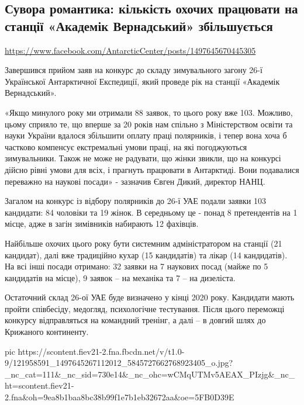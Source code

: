  
 

\subsection{Сувора романтика: кількість охочих працювати на станції «Академік Вернадський» збільшується}

\url{https://www.facebook.com/AntarcticCenter/posts/1497645670445305}

Завершився прийом заяв на конкурс до складу зимувального загону 26-ї
Української Антарктичної Експедиції, який проведе рік на станції «Академік
Вернадський».

«Якщо минулого року ми отримали 88 заявок, то цього року вже 103. Можливо,
цьому сприяло те, що вперше за 20 років нам спільно з Міністерством освіти та
науки України вдалося збільшити оплату праці полярників, і тепер вона хоча б
частково компенсує екстремальні умови праці, на які погоджуються зимувальники.
Також не може не радувати, що жінки звикли, що на конкурсі дійсно рівні умови
для всіх, і прагнуть працювати в Антарктиді. Вони подавалися переважно на
наукові посади» - зазначив Євген Дикий, директор НАНЦ.

Загалом на конкурс із відбору полярників до 26-ї УАЕ подали заявки 103
кандидати: 84 чоловіки та 19 жінок. В середньому це - понад 8 претендентів на 1
місце, адже в загін зимівників набирають 12 фахівців.

Найбільше охочих цього року бути системним адміністратором на станції (21
кандидат), далі вже традиційно кухар (15 кандидатів) та лікар (14 кандидатів).
На всі інші посади отримано: 32 заявки на 7 наукових посад (майже по 5
кандидатів на місце), 9 заявок – на механіка та 7 – на дизеліста. 

Остаточний склад 26-ої УАЕ буде визначено у кінці 2020 року. Кандидати мають
пройти співбесіду, медогляд, психологічне тестування. Після цього переможці
конкурсу відправляться на командний тренінг, а далі – в довгий шлях до
Крижаного континенту.

\ifcmt
pic https://scontent.fiev21-2.fna.fbcdn.net/v/t1.0-9/121958591_1497645267112012_5845727662768923405_o.jpg?_nc_cat=111&_nc_sid=730e14&_nc_ohc=wCMqUTMv5AEAX_PIzjg&_nc_ht=scontent.fiev21-2.fna&oh=9ea8b1baa8bc38b99f1e7b1eb32672aa&oe=5FB0D39E
\fi


